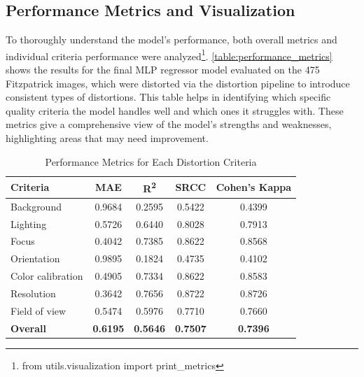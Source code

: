 \subsection{Performance Metrics and Visualization}
\label{sub:PerfMetrics}
To thoroughly understand the model's performance, both overall metrics and individual criteria performance were analyzed\footnote{from utils.visualization import print\_metrics}. \autoref{table:performance_metrics} shows the results for the final MLP regressor model evaluated on the 475 Fitzpatrick images, which were distorted via the distortion pipeline to introduce consistent types of distortions. This table helps in identifying which specific quality criteria the model handles well and which ones it struggles with. These metrics give a comprehensive view of the model’s strengths and weaknesses, highlighting areas that may need improvement. \par
\begin{table}[h]
    \centering
    \begin{tabular}{|l|c|c|c|c|}
        \hline
        \textbf{Criteria} & \textbf{MAE} & \textbf{R\textsuperscript{2}} & \textbf{SRCC} & \textbf{Cohen's Kappa} \\
        \hline
        Background & 0.9684 & 0.2595 & 0.5422 & 0.4399 \\
        Lighting & 0.5726 & 0.6440 & 0.8028 & 0.7913 \\
        Focus & 0.4042 & 0.7385 & 0.8622 & 0.8568 \\
        Orientation & 0.9895 & 0.1824 & 0.4735 & 0.4102 \\
        Color calibration & 0.4905 & 0.7334 & 0.8622 & 0.8583 \\
        Resolution & 0.3642 & 0.7656 & 0.8722 & 0.8726 \\
        Field of view & 0.5474 & 0.5976 & 0.7710 & 0.7660 \\
        \hline
        \textbf{Overall} & \textbf{0.6195} & \textbf{0.5646} & \textbf{0.7507} & \textbf{0.7396} \\
        \hline
    \end{tabular}
    \caption{Performance Metrics for Each Distortion Criteria}
    \label{table:performance_metrics}
\end{table}

